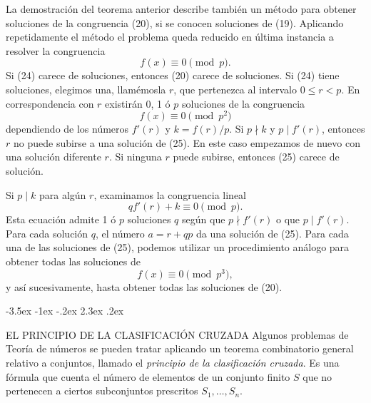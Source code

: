 \documentclass[12pt,a4paper]{book}
\makeatletter
\renewcommand\section{\@startsection{section}{1}{\z@}%
  {-3.5ex \@plus -1ex \@minus -.2ex}%
  {2.3ex \@plus .2ex}%
  {\normalfont\Large\bfseries\raggedright}}
\makeatother
\begin{document}
    La demostración del teorema anterior describe también un método para obtener
    soluciones de la congruencia (20), si se conocen soluciones de (19). Aplicando
    repetidamente el método el problema queda reducido en última instancia a resolver la
    congruencia
    \begin{equation}
        f(x)\equiv0\pmod{p}.
    \end{equation}
    Si (24) carece de soluciones, entonces (20) carece de soluciones. Si (24) tiene
    soluciones, elegimos una, llamémosla $r$, que pertenezca al intervalo $0\leq r<p$. En
    correspondencia con $r$ existirán 0, 1 ó $p$ soluciones de la congruencia
    \begin{equation}
        f(x)\equiv0\pmod{p^{2}}
    \end{equation}
    dependiendo de los números $f'(r)$ y $k=f(r)/p$. Si $p\nmid k$ y $p\mid f'(r)$,
    entonces $r$ no puede subirse a una solución de (25). En este caso empezamos de nuevo
    con una solución diferente $r$. Si ninguna $r$ puede subirse, entonces (25) carece de
    solución.

    Si $p\mid k$ para algún $r$, examinamos la congruencia lineal
    \begin{equation*}
        qf'(r)+k\equiv0\pmod{p}.
    \end{equation*}
    Esta ecuación admite 1 ó $p$ soluciones $q$ según que $p\nmid f'(r)$ o que
    $p\mid f'(r)$. Para cada solución $q$, el número $a=r+qp$ da una solución de (25).
    Para cada una de las soluciones de (25), podemos utilizar un procedimiento análogo
    para obtener todas las soluciones de
    \begin{equation*}
        f(x)\equiv0\pmod{p^{3}},
    \end{equation*}
    y así sucesivamente, hasta obtener todas las soluciones de (20).

    \section{EL PRINCIPIO DE LA CLASIFICACIÓN CRUZADA}
    Algunos problemas de Teoría de números se pueden tratar aplicando un teorema
    combinatorio general relativo a conjuntos, llamado el \textit{principio de la
    clasificación cruzada}. Es una fórmula que cuenta el número de elementos de un
    conjunto finito $S$ que no pertenecen a ciertos subconjuntos prescritos
    $S_{1},\dots,S_{n}$.
\end{document}
